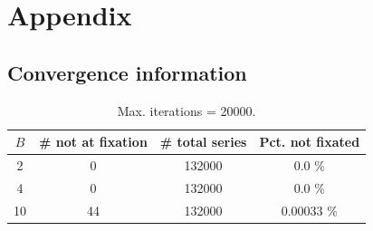 \documentclass[letterpaper,11.5pt]{scrartcl}
\begin{document}

% 



\appendix


\section{Appendix}

\subsection{Convergence information}

\begin{table}[h] \caption{Max. iterations = 20000.} \label{tab:convergence} \centering
  \begin{tabular}{cccc} \toprule $B$ & \# not at fixation & \# total series & Pct. not fixated
    \\ \midrule  2  & 0  & 132000 & 0.0 \% \\ 4  & 0  & 132000 & 0.0 \% \\ 10 & 44 & 132000 &
    0.00033  \% \\ \bottomrule \end{tabular} \end{table}


\newpage
\end{document}
